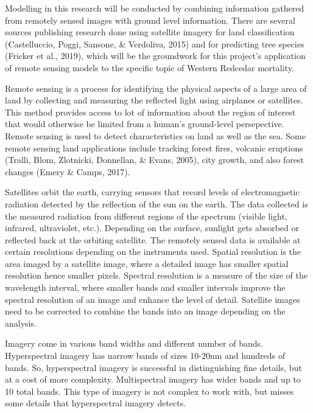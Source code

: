 \documentclass[12pt,twoside]{reedthesis}
\begin{document}
Modelling in this research will be conducted by combining information gathered from remotely sensed images with ground level information. There are several sources publishing research done using satellite imagery for land classification (Castelluccio, Poggi, Sansone, \& Verdoliva, 2015) and for predicting tree species (Fricker et al., 2019), which will be the groundwork for this project's application of remote sensing models to the specific topic of Western Redcedar mortality.

Remote sensing is a process for identifying the physical aspects of a large area of land by collecting and measuring the reflected light using airplanes or satellites. This method provides access to lot of information about the region of interest that would otherwise be limited from a human's ground-level persepective. Remote sensing is used to detect characteristics on land as well as the sea. Some remote sensing land applications include tracking forest fires, volcanic eruptions (Tralli, Blom, Zlotnicki, Donnellan, \& Evans, 2005), city growth, and also forest changes (Emery \& Camps, 2017).

Satellites orbit the earth, carrying sensors that record levels of electromagnetic radiation detected by the reflection of the sun on the earth. The data collected is the measured radiation from different regions of the spectrum (visible light, infrared, ultraviolet, etc.). Depending on the surface, sunlight gets absorbed or reflected back at the orbiting satellite. The remotely sensed data is available at certain resolutions depending on the instruments used. Spatial resolution is the area imaged by a satellite image, where a detailed image has smaller spatial resolution hence smaller pixels. Spectral resolution is a measure of the size of the wavelength interval, where smaller bands and smaller intervals improve the spectral resolution of an image and enhance the level of detail. Satellite images need to be corrected to combine the bands into an image depending on the analysis.

Imagery come in various band widths and different number of bands. Hyperspectral imagery has narrow bands of sizes 10-20nm and hundreds of bands. So, hyperspectral imagery is successful in distinguishing fine details, but at a cost of more complexity. Multispectral imagery has wider bands and up to 10 total bands. This type of imagery is not complex to work with, but misses some details that hyperspectral imagery detects.
\end{document}
